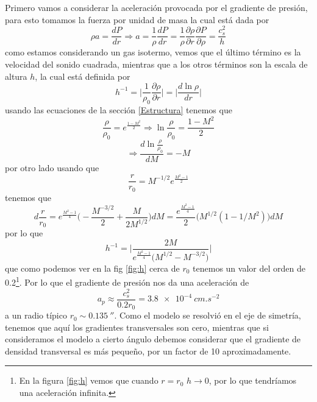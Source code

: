 \documentclass{book}
\begin{document}
Primero vamos a considerar la aceleración provocada por el gradiente de presión, para esto tomamos la fuerza por unidad de masa la cual está dada por 
\begin{equation}
\rho a = \frac{dP}{dr}\Rightarrow a= \frac{1}{\rho}\frac{dP}{dr}=\frac{1}{\rho}\frac{\partial \rho}{\partial r}\frac{\partial P}{\partial\rho}=\frac{c_s^2}{h}
\end{equation}
como estamos considerando un gas isotermo, vemos que el último término es la velocidad del sonido cuadrada, mientras que a los otros términos son la escala de altura $h$, la cual está definida por 
\begin{equation}
h^{-1}=\Big|\frac{1}{\rho_0}\frac{\partial\rho}{\partial r}\Big|=\Big|\frac{d \ln \rho}{dr}\Big|
\end{equation}
usando las ecuaciones de la sección \ref{Estructura} tenemos que 
\begin{equation}
\frac{\rho}{\rho_0}=e^{\frac{1-M^2}{2}}\Rightarrow\ln\frac{\rho}{\rho_0}=\frac{1-M^2}{2}
\end{equation}
\begin{equation}
\Rightarrow\frac{d\ln\frac{\rho}{\rho_0}}{dM}=-M
\end{equation}
por otro lado usando que 
\begin{equation}
\frac{r}{r_0}=M^{-1/2}e^{\frac{M^2-1}{2}}
\end{equation}
tenemos que 
\begin{equation}
d\frac{r}{r_0}=e^{\frac{M^2-1}{4}}\Big(-\frac{M^{-3/2}}{2}+\frac{M}{2M^{1/2}}\Big)dM = \frac{e^{\frac{M^2-1}{4}}}{2}\Big(M^{1/2}(1-1/M^2) \Big)dM
\end{equation}
por lo que 
\begin{equation}
h^{-1}=\Big|\frac{2M}{e^{\frac{M^2-1}{4}}\Big(M^{1/2}-M^{-3/2}\Big)}\Big|
\end{equation}
que como podemos ver en la fig \ref{fig:h} cerca de $r_0$ tenemos un valor del orden de 0.2\footnote{En la figura \ref{fig:h} vemos que cuando $r=r_0$ $h\to 0$, por lo que tendríamos una aceleración infinita.}. Por lo que el gradiente de presión nos da una aceleración de 
\begin{equation}
a_p \approx \frac{c_s^2}{0.2 r_0} = \SI{3.8e-4}{cm.s^{-2}}
\end{equation}
a un radio típico $r_0\sim \SI{0.135}{\arcsecond}$. Como el modelo se resolvió en el eje de simetría, tenemos que aquí los gradientes transversales son cero, mientras que si consideramos el modelo a cierto ángulo debemos considerar que el gradiente de densidad transversal es más pequeño, por un factor de 10 aproximadamente. 
\end{document}
